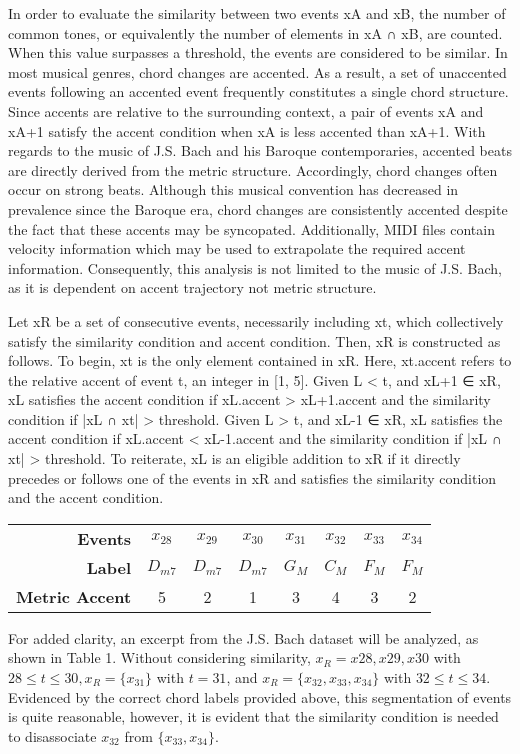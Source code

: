 \documentclass{article} %
\begin{document}
In order to evaluate the similarity between two events xA and xB, the number of common tones, or equivalently the number of elements in xA ∩ xB, are counted. When this value surpasses a threshold, the events are considered to be similar. In most musical genres, chord changes are accented. As a result, a set of unaccented events following an accented event frequently constitutes a single chord structure. Since accents are relative to the surrounding context, a pair of events xA and xA+1 satisfy the accent condition when xA is less accented than xA+1. With regards to the music of J.S. Bach and his Baroque contemporaries, accented beats are directly derived from the metric structure. Accordingly, chord changes often occur on strong beats. Although this musical convention has decreased in prevalence since the Baroque era, chord changes are consistently accented despite the fact that these accents may be syncopated. Additionally, MIDI files contain velocity information which may be used to extrapolate the required accent information. Consequently, this analysis is not limited to the music of J.S. Bach, as it is dependent on accent trajectory not metric structure.

Let xR be a set of consecutive events, necessarily including xt, which collectively satisfy the similarity condition and accent condition. Then, xR is constructed as follows. To begin, xt is the only element contained in xR. Here, xt.accent refers to the relative accent of event t, an integer in [1, 5]. Given L < t, and xL+1 ∈ xR, xL satisfies the accent condition if xL.accent > xL+1.accent and the similarity condition if |xL ∩ xt| > threshold. Given L > t, and xL-1 ∈ xR, xL satisfies the accent condition if xL.accent < xL-1.accent and the similarity condition if |xL ∩ xt| > threshold. To reiterate, xL is an eligible addition to xR if it directly precedes or follows one of the events in xR and satisfies the similarity condition and the accent condition.

\begin{tabular}{ r | c c c c c c c }
  \textbf{Events}        & $x_{28}$ & $x_{29}$ & $x_{30}$ & $x_{31}$ & $x_{32}$ & $x_{33}$ & $x_{34}$ \\
  \textbf{Label}         & $D_{m7}$ & $D_{m7}$ & $D_{m7}$ & $G_M$ & $C_M$ & $F_M$ & $F_M$ \\
  \textbf{Metric Accent} & 5 & 2 & 1 & 3 & 4 & 3 & 2 \\
\end{tabular}

For added clarity, an excerpt from the J.S. Bach dataset will be analyzed, as shown in Table 1. Without considering similarity, $x_R = { x28, x29, x30 }$ with $28 \leq t \leq 30, x_R = \{ x_31 \}$ with $t = 31$, and $x_R = \{ x_{32}, x_{33}, x_{34} \}$ with $32 \leq t \leq 34$. Evidenced by the correct chord labels provided above, this segmentation of events is quite reasonable, however, it is evident that the similarity condition is needed to disassociate $x_{32}$ from $\{ x_{33}, x_{34} \}$.
\end{document}
